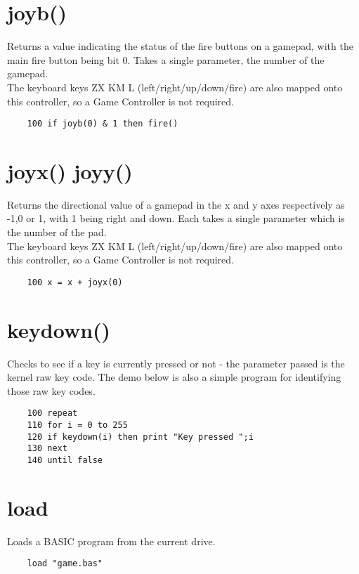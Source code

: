 \section*{joyb()}
Returns a value indicating the status of the fire buttons on a gamepad, with the main fire button being bit 0. Takes a single parameter, the number of the gamepad.\\

The keyboard keys ZX KM L (left/right/up/down/fire) are also mapped onto this controller, so a Game Controller is not required.

\example{}
\begin{verbatim}
	100 if joyb(0) & 1 then fire()
\end{verbatim}

\section*{joyx() joyy()}
Returns the directional value of a gamepad in the x and y axes respectively as -1,0 or 1, with 1 being right and down. Each takes a single parameter which is the number of the pad.\\

The keyboard keys ZX KM L (left/right/up/down/fire) are also mapped onto this controller, so a Game Controller is not required.

\example{}
\begin{verbatim}
	100 x = x + joyx(0)
\end{verbatim}

\section*{keydown()}
Checks to see if a key is currently pressed or not - the parameter passed is the kernel raw key code. The demo below is also a simple program for identifying those raw key codes.
\example{}
\begin{verbatim}
	100 repeat
	110 for i = 0 to 255
	120 if keydown(i) then print "Key pressed ";i
	130 next
	140 until false
\end{verbatim}

\section*{load}
Loads a BASIC program from the current drive.
\example{}
\begin{verbatim}
	load "game.bas"
\end{verbatim}

